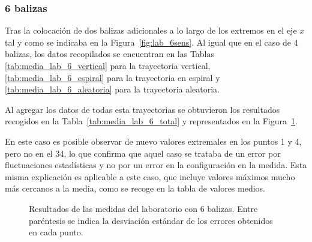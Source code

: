 
\subsubsection{6 balizas}
Tras la colocación de dos balizas adicionales a lo largo de los extremos en el eje $x$ tal y como se indicaba en la Figura~\ref{fig:lab_6sens}.
Al igual que en el caso de 4 balizas, los datos recopilados se encuentran en las Tablas \ref{tab:media_lab_6_vertical} para la trayectoria vertical, \ref{tab:media_lab_6_espiral} para la trayectoria en espiral y \ref{tab:media_lab_6_aleatoria} para la trayectoria aleatoria.

Al agregar los datos de todas esta trayectorias se obtuvieron los resultados recogidos en la Tabla~\ref{tab:media_lab_6_total} y representados en la Figura~\ref{fig:res_lab}.

En este caso es posible observar de nuevo valores extremales en los puntos 1 y 4, pero no en el 34, lo que confirma que aquel caso se trataba de un error por fluctuaciones estadísticas y no por un error en la configuración en la medida.
Esta misma explicación es aplicable a este caso, que incluye valores máximos mucho más cercanos a la media, como se recoge en la tabla de valores medios.

\begin{figure}[H]
    \centering
    
    \caption{Resultados de las medidas del laboratorio con 6 balizas. \newline Entre paréntesis se indica la desviación estándar de los errores obtenidos en cada punto.}
    \label{fig:res_lab}
\end{figure}


